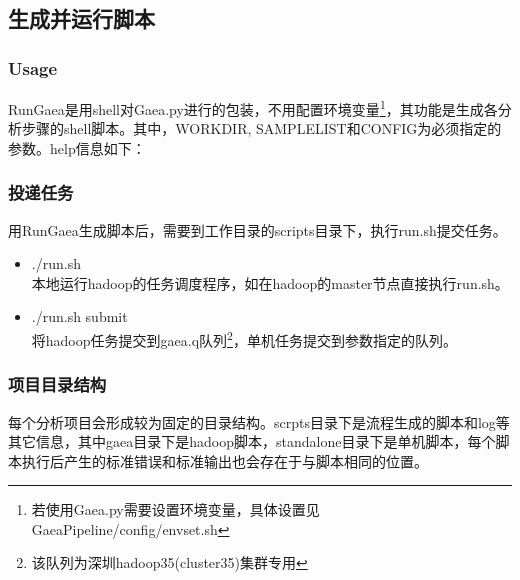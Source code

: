 \documentclass[UTF8,10pt,a4paper]{ctexart}
\begin{document}
\newpage
\subsection{生成并运行脚本}
\label{sec:3}
\subsubsection{Usage}
RunGaea是用shell对Gaea.py进行的包装，不用配置环境变量\footnote{若使用Gaea.py需要设置环境变量，具体设置见GaeaPipeline/config/envset.sh}，其功能是生成各分析步骤的shell脚本。其中，WORKDIR, SAMPLELIST和CONFIG为必须指定的参数。help信息如下：

\subsubsection{投递任务}
用RunGaea生成脚本后，需要到工作目录的scripts目录下，执行run.sh提交任务。
\begin{itemize}
\item ./run.sh\\
	本地运行hadoop的任务调度程序，如在hadoop的master节点直接执行run.sh。
\item ./run.sh submit\\
	将hadoop任务提交到gaea.q队列\footnote{该队列为深圳hadoop35(cluster35)集群专用}，单机任务提交到参数指定的队列。
\end{itemize}


\newpage
\subsubsection{项目目录结构}
%
每个分析项目会形成较为固定的目录结构。scrpts目录下是流程生成的脚本和log等其它信息，其中gaea目录下是hadoop脚本，standalone目录下是单机脚本，每个脚本执行后产生的标准错误和标准输出也会存在于与脚本相同的位置。%
\end{document}
